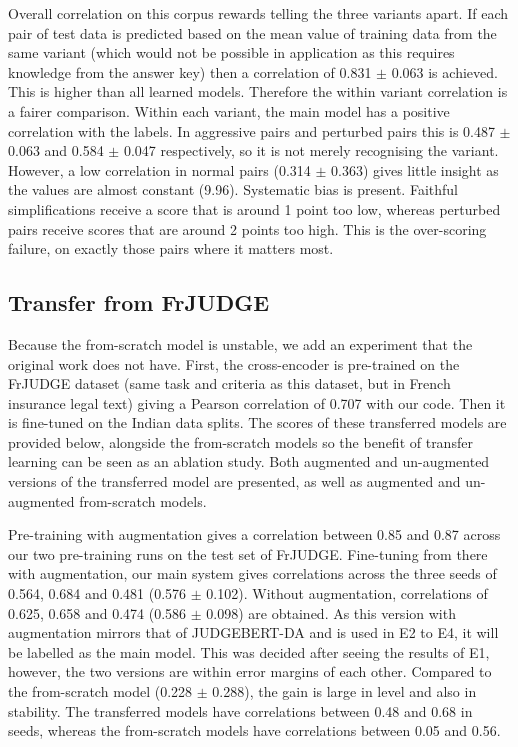 \documentclass[conference]{IEEEtran}
\begin{document}
Overall correlation on this corpus rewards telling the three variants apart. If each pair of test data is predicted based on the mean value of training data from the same variant (which would not be possible in application as this requires knowledge from the answer key) then a correlation of 0.831 \ensuremath{\pm} 0.063 is achieved. This is higher than all learned models. Therefore the within variant correlation is a fairer comparison. Within each variant, the main model has a positive correlation with the labels. In aggressive pairs and perturbed pairs this is 0.487 \ensuremath{\pm} 0.063 and 0.584 \ensuremath{\pm} 0.047 respectively, so it is not merely recognising the variant. However, a low correlation in normal pairs (0.314 \ensuremath{\pm} 0.363) gives little insight as the values are almost constant (9.96). Systematic bias is present. Faithful simplifications receive a score that is around 1 point too low, whereas perturbed pairs receive scores that are around 2 points too high. This is the over-scoring failure, on exactly those pairs where it matters most.

\subsection{Transfer from FrJUDGE}

Because the from-scratch model is unstable, we add an experiment that the original work does not have. First, the cross-encoder is pre-trained on the FrJUDGE dataset (same task and criteria as this dataset, but in French insurance legal text) giving a Pearson correlation of 0.707 with our code. Then it is fine-tuned on the Indian data splits. The scores of these transferred models are provided below, alongside the from-scratch models so the benefit of transfer learning can be seen as an ablation study. Both augmented and un-augmented versions of the transferred model are presented, as well as augmented and un-augmented from-scratch models.

Pre-training with augmentation gives a correlation between 0.85 and 0.87 across our two pre-training runs on the test set of FrJUDGE. Fine-tuning from there with augmentation, our main system gives correlations across the three seeds of 0.564, 0.684 and 0.481 (0.576 \ensuremath{\pm} 0.102). Without augmentation, correlations of 0.625, 0.658 and 0.474 (0.586 \ensuremath{\pm} 0.098) are obtained. As this version with augmentation mirrors that of JUDGEBERT-DA and is used in E2 to E4, it will be labelled as the main model. This was decided after seeing the results of E1, however, the two versions are within error margins of each other. Compared to the from-scratch model (0.228 \ensuremath{\pm} 0.288), the gain is large in level and also in stability. The transferred models have correlations between 0.48 and 0.68 in seeds, whereas the from-scratch models have correlations between 0.05 and 0.56.
\end{document}
